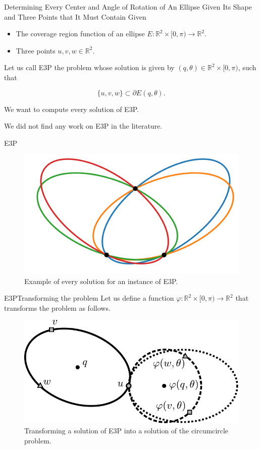 \documentclass{beamer}
\newcommand{\R}{\mathbb{R}}
\theoremstyle{definition}
\begin{document}

\begin{frame}{Determining Every Center and Angle of Rotation of An Ellipse Given Its Shape and Three Points that It Must Contain}
	Given
	\begin{itemize}
		\item The coverage region function of an ellipse $E \colon \R^2 \times [0, \pi) \to \R^2$.
		\item Three points $u, v, w \in \R^2$.
	\end{itemize}
Let us call E3P the problem whose solution is given by $(q, \theta) \in \R^2 \times [0, \pi)$, such that

$$\{u, v, w\} \subset \partial E(q, \theta).$$

We want to compute every solution of E3P.

We did not find any work on E3P in the literature.
\end{frame}

\begin{frame}{E3P}
	\begin{figure}
		\centering
		\includegraphics[scale=.4]{../tex/figures/e3p_4sols}
		\caption{Example of every solution for an instance of E3P.}
	\end{figure}
\end{frame}

\begin{frame}{E3P}{Transforming the problem}
	Let us define a function $\varphi \colon \R^2 \times [0, \pi) \to \R^2$ that transforms the problem as follows.
	\begin{figure}
		\centering
		\includegraphics[scale=.7]{../article/figures/circumscribed-circle}
		\caption{Transforming a solution of E3P into a solution of the circumcircle problem.}
	\end{figure}
\end{frame}
\end{document}
